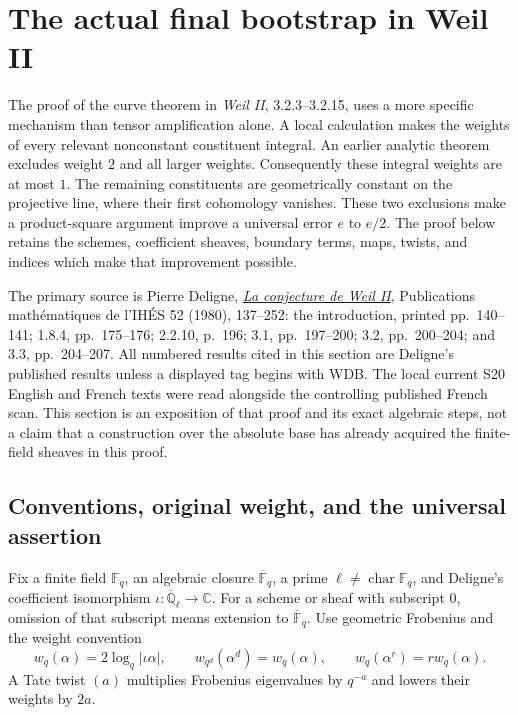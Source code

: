 \section{The actual final bootstrap in Weil II}
\label{weil-ii-dyadic-bootstrap}

The proof of the curve theorem in \emph{Weil II}, 3.2.3--3.2.15,
uses a more specific mechanism than tensor amplification alone. A local
calculation makes the weights of every relevant nonconstant constituent
integral. An earlier analytic theorem excludes weight \(2\) and all larger
weights. Consequently these integral weights are at most \(1\). The
remaining constituents are geometrically constant on the projective
line, where their first cohomology vanishes. These two exclusions make a
product-square argument improve a universal error \(e\) to \(e/2\).
The proof below retains the schemes, coefficient sheaves, boundary
terms, maps, twists, and indices which make that improvement possible.

The primary source is Pierre Deligne,
\href{https://www.numdam.org/item/PMIHES_1980__52__137_0/}
{\emph{La conjecture de Weil II}}, Publications math\'ematiques de
l'IH\'ES 52 (1980), 137--252: the introduction, printed pp.~140--141;
1.8.4, pp.~175--176; 2.2.10, p.~196; 3.1, pp.~197--200;
3.2, pp.~200--204; and 3.3, pp.~204--207. All numbered results cited
in this section are Deligne's published results unless a displayed tag
begins with WDB. The local current S20 English and French texts were
read alongside the controlling published French scan. This section is
an exposition of that proof and its exact algebraic steps, not a claim
that a construction over the absolute base has already acquired the
finite-field sheaves in this proof.

\subsection{Conventions, original weight, and the universal assertion}

Fix a finite field \(\mathbb F_q\), an algebraic closure
\(\overline{\mathbb F}_q\), a prime \(\ell\ne\operatorname{char}
\mathbb F_q\), and Deligne's coefficient isomorphism
\(\iota:\overline{\mathbb Q}_\ell\longrightarrow\mathbb C\).
For a scheme or sheaf with subscript \(0\), omission of that subscript
means extension to \(\overline{\mathbb F}_q\). Use geometric
Frobenius and the weight convention
\[
 w_q(\alpha)=2\log_q|\iota\alpha|,
 \qquad w_{q^d}(\alpha^d)=w_q(\alpha),
 \qquad w_q(\alpha^r)=r w_q(\alpha).
 \tag{WDB1}
\]
A Tate twist \((a)\) multiplies Frobenius eigenvalues by
\(q^{-a}\) and lowers their weights by \(2a\).

